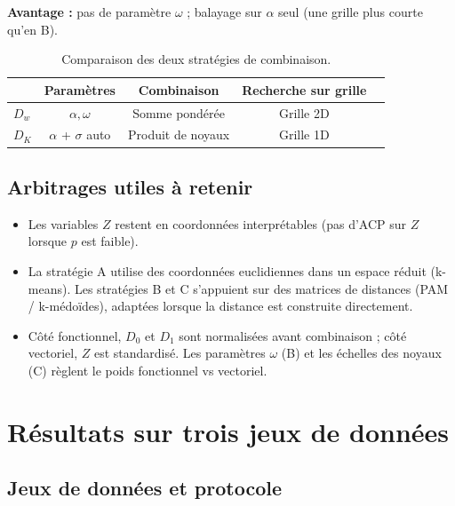 \documentclass[11pt, a4paper]{article}
\newcommand{\Dw}{D_w}
\newcommand{\DK}{D_K}
\begin{document}
\textbf{Avantage :} pas de paramètre $\omega$ ; balayage sur $\alpha$ seul
(une grille plus courte qu'en B).

\begin{table}[H]
\centering
\begin{tabular}{lcccc}
  \toprule
  & \textbf{Paramètres} & \textbf{Combinaison} & \textbf{Recherche sur grille} \\
  \midrule
  $\Dw$ & $\alpha, \omega$ & Somme pondérée & Grille 2D \\
  $\DK$ & $\alpha$ + $\sigma$ auto & Produit de noyaux & Grille 1D \\
  \bottomrule
\end{tabular}
\caption{Comparaison des deux stratégies de combinaison.}
\end{table}

\subsection{Arbitrages utiles à retenir}

\begin{itemize}[nosep]
  \item Les variables $Z$ restent en coordonnées interprétables (pas d'ACP
    sur $Z$ lorsque $p$ est faible).
  \item La stratégie A utilise des coordonnées euclidiennes dans un espace
    réduit (k-means). Les stratégies B et C s'appuient sur des matrices de
    distances (PAM / k-médoïdes), adaptées lorsque la distance est construite
    directement.
  \item Côté fonctionnel, $D_0$ et $D_1$ sont normalisées avant combinaison ;
    côté vectoriel, $Z$ est standardisé. Les paramètres $\omega$ (B) et les
    échelles des noyaux (C) règlent le poids fonctionnel vs vectoriel.
\end{itemize}

\newpage
\section{Résultats sur trois jeux de données}

\subsection{Jeux de données et protocole}
\end{document}
